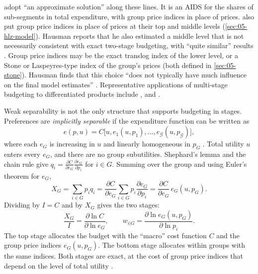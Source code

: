 \citet[p.~13]{ChaudhuriGoldbergJia2006} adopt ``an approximate solution'' along these lines. It is an AIDS
for the shares of sub-segments in total expenditure, with group price indices in place of prices.
\citet{HausmanLeonardZona1994} also put group price indices in place of prices at their top and middle
levels (\cref{sec:05-hlz-model}). Hausman reports that he also estimated a
middle level that is not necessarily consistent with exact two-stage budgeting, with ``quite similar''
results \citep[fn.~17]{Hausman1997}. Group price indices may be the exact translog index of the lower
level, or a Stone or Laspeyres-type index of the group's prices (both defined in \cref{sec:05-stone}).
Hausman finds that this choice ``does
not typically have much influence on the final model estimates'' \citep[p.~218]{Hausman1997}.
Representative applications of multi-stage budgeting to differentiated products include
\citet{HausmanLeonardZona1994}, \citet{EllisonEtAl1997} and \citet{HausmanLeonard2002}.

\begin{remark}\label{rem:05-implicit-sep}
Weak separability is not the only structure that supports budgeting in stages. Preferences are
\emph{implicitly separable} if the expenditure function can be written as
\begin{equation*}
  e(p, u) = C\bigl[u, e_1(u, p_1), \dots, e_{\mathcal{G}}(u, p_{\mathcal{G}})\bigr],
\end{equation*}
where each $e_G$ is increasing in $u$ and linearly homogeneous in $p_G$ \citep{Gorman1970}. Total utility
$u$ enters every $e_G$, and there are no group subutilities. Shephard's lemma and the chain rule give
$q_i = \frac{\partial C}{\partial e_G}\frac{\partial e_G}{\partial p_i}$ for $i \in G$. Summing over the
group and using Euler's theorem for $e_G$,
\begin{equation*}
  X_G = \sum_{i \in G} p_iq_i = \frac{\partial C}{\partial e_G}\sum_{i \in G} p_i\frac{\partial e_G}{\partial p_i}
      = \frac{\partial C}{\partial e_G}\, e_G(u, p_G).
\end{equation*}
Dividing by $I = C$ and by $X_G$ gives the two stages:
\begin{equation*}
  \frac{X_G}{I} = \frac{\partial\ln C}{\partial\ln e_G}, \qquad
  w_{i|G} = \frac{\partial\ln e_G(u, p_G)}{\partial\ln p_i}.
\end{equation*}
The top stage allocates the budget with the ``macro'' cost function $C$ and the group price indices $e_G(u,
p_G)$. The bottom stage allocates within groups with the same indices. Both stages are exact, at the cost
of group price indices that depend on the level of total utility \citep[\S 5.2, eqs.~2.24--2.28,
pp.~133--134]{DeatonMuellbauer1980b}.
\end{remark}

